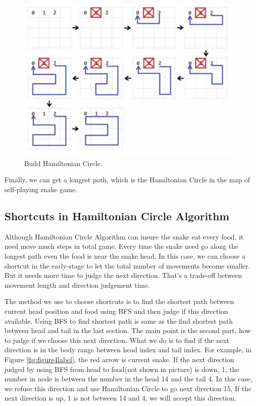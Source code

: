 \documentclass[12pt]{article}
\begin{document}
\begin{figure}[H]
\centering 
\includegraphics[scale = 0.4]{2.png}
\caption{Build Hamiltonian Circle.}
\label{fig:figure3label}
\end{figure}

Finally, we can get a longest path, which is the Hamiltonian Circle in the map of self-playing snake game.

\subsection{Shortcuts in Hamiltonian Circle Algorithm}

Although Hamiltonian Circle Algorithm can insure the snake eat every food, it need move much steps in total game. Every time the snake need go along the longest path even the food is near the snake head. In this case, we can choose a shortcut in the early-stage to let the total number of movements become smaller. But it needs more time to judge the next direction. That's a trade-off between movement length and direction judgement time. 

The method we use to choose shortcuts is to find the shortest path between current head position and food using BFS and then judge if this direction available. Using BFS to find shortest path is same as the find shortest path between head and tail in the last section. The main point is the second part, how to judge if we choose this next direction. What we do is to find if the next direction is in the body range between head index and tail index. For example, in Figure \ref{fig:figure4label}, the red arrow is current snake. If the next direction judged by using BFS from head to food(not shown in picture) is down, 1, the number in node is  between the number in the head 14 and the tail 4. In this case, we refuse this direction and use Hamiltonian Circle to go next direction 15. If the next direction is up, 1 is not between 14 and 4, we will accept this direction.  
\end{document}
